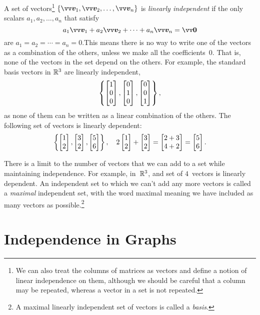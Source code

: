 \documentclass[twoside]{article}
\begin{document}
A set of vectors\footnote{
  We can also treat the columns of matrices as vectors and define a notion of linear independence on them, although we should be careful that a column may be repeated, whereas a vector in a set is not repeated.
}
$\{\bv{v}_1, \bv{v}_2, \ldots, \bv{v}_n\}$ is \emph{linearly independent} if the only scalars ${a_1, a_2, \ldots, a_n}$ that satisfy
\begin{equation*}
  a_1\bv{v}_1 + a_2\bv{v}_2 + \cdots + a_n\bv{v}_n = \bv{0}
\end{equation*}
are ${a_1 = a_2 = \cdots = a_n = 0}$.This means there is no way to write one of the vectors as a combination of the others, unless we make all the coefficients~$0$.
That is, none of the vectors in the set depend on the others.
For example, the standard basis vectors in $\mathbb{R}^3$ are linearly independent,
\begin{equation*}
  \left\{\begin{bmatrix}1\\0\\0\end{bmatrix}, \begin{bmatrix}0\\1\\0\end{bmatrix}, \begin{bmatrix}0\\0\\1\end{bmatrix}\right\},
\end{equation*}
as none of them can be written as a linear combination of the others.
The following set of vectors is linearly dependent:
\begin{equation*}
  \left\{\begin{bmatrix}1\\2\end{bmatrix}, \begin{bmatrix}3\\2\end{bmatrix}, \begin{bmatrix}5\\6\end{bmatrix}\right\}, \quad 2\begin{bmatrix}1\\2\end{bmatrix} + \begin{bmatrix}3\\2\end{bmatrix} = \begin{bmatrix}2 + 3\\4 + 2\end{bmatrix} = \begin{bmatrix}5\\6\end{bmatrix}.
\end{equation*}

There is a limit to the number of vectors that we can add to a set while maintaining independence.
For example, in~$\mathbb{R}^3$, and set of $4$~vectors is linearly dependent.
An independent set to which we can't add any more vectors is called a \emph{maximal} independent set, with the word maximal meaning we have included as many vectors as possible.\footnote{
  A maximal linearly independent set of vectors is called a \emph{basis}.
}

\section{Independence in Graphs}
\end{document}
